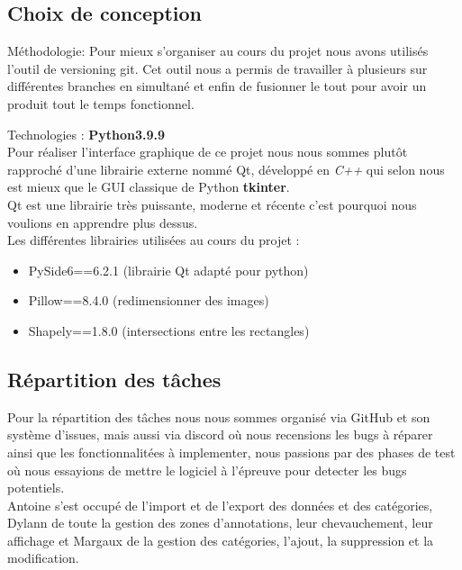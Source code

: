 \documentclass[a4paper,12pt]{article}
\begin{document}
\subsection{Choix de conception}

\begin{description}
\item Méthodologie:
Pour mieux s'organiser au cours du projet nous avons utilisés l'outil de versioning git.
Cet outil nous a permis de travailler à plusieurs sur différentes branches en simultané et enfin de fusionner le tout pour avoir un produit tout le temps fonctionnel.

\item Technologies : \textbf{Python3.9.9}\\
Pour réaliser l'interface graphique de ce projet nous nous sommes plutôt rapproché d'une librairie externe nommé Qt, développé en \textit{C++} qui selon nous est mieux que le GUI classique de Python \guillemotleft \textbf{tkinter}\guillemotright.\\
Qt est une librairie très puissante, moderne et récente c'est pourquoi nous voulions en apprendre plus dessus.\\
Les différentes librairies utilisées au cours du projet :
    \begin{itemize}
        \item PySide6==6.2.1 (librairie Qt adapté pour python)
        \item Pillow==8.4.0 (redimensionner des images)
        \item Shapely==1.8.0 (intersections entre les rectangles)
    \end{itemize}
\end{description}
\newpage

\subsection{Répartition des tâches}
Pour la répartition des tâches nous nous sommes organisé via GitHub et son système d'issues, mais aussi via discord où nous recensions les bugs à réparer ainsi que les fonctionnalitées à implementer, nous passions par des phases de test où nous essayions de mettre le logiciel à l'épreuve pour detecter les bugs potentiels. \\

Antoine s'est occupé de l'import et de l'export des données et des catégories, Dylann de toute la gestion des zones d'annotations, leur chevauchement, leur affichage et Margaux de la gestion des catégories, l'ajout, la suppression et la modification.
\end{document}
